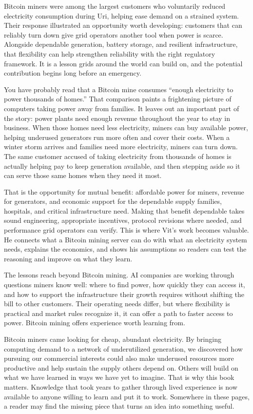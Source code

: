 Bitcoin miners were among the largest customers who voluntarily reduced electricity consumption during Uri, helping ease demand on a strained system. Their response illustrated an opportunity worth developing: customers that can reliably turn down give grid operators another tool when power is scarce. Alongside dependable generation, battery storage, and resilient infrastructure, that flexibility can help strengthen reliability with the right regulatory framework. It is a lesson grids around the world can build on, and the potential contribution begins long before an emergency.

You have probably read that a Bitcoin mine consumes ``enough electricity to power thousands of homes.'' That comparison paints a frightening picture of computers taking power away from families. It leaves out an important part of the story: power plants need enough revenue throughout the year to stay in business. When those homes need less electricity, miners can buy available power, helping underused generators run more often and cover their costs. When a winter storm arrives and families need more electricity, miners can turn down. The same customer accused of taking electricity from thousands of homes is actually helping pay to keep generation available, and then stepping aside so it can serve those same homes when they need it most.

That is the opportunity for mutual benefit: affordable power for miners, revenue for generators, and economic support for the dependable supply families, hospitals, and critical infrastructure need. Making that benefit dependable takes sound engineering, appropriate incentives, protocol revisions where needed, and performance grid operators can verify. This is where Vit's work becomes valuable. He connects what a Bitcoin mining server can do with what an electricity system needs, explains the economics, and shows his assumptions so readers can test the reasoning and improve on what they learn.

The lessons reach beyond Bitcoin mining. AI companies are working through questions miners know well: where to find power, how quickly they can access it, and how to support the infrastructure their growth requires without shifting the bill to other customers. Their operating needs differ, but where flexibility is practical and market rules recognize it, it can offer a path to faster access to power. Bitcoin mining offers experience worth learning from.

Bitcoin miners came looking for cheap, abundant electricity. By bringing computing demand to a network of underutilized generation, we discovered how pursuing our commercial interests could also make underused resources more productive and help sustain the supply others depend on. Others will build on what we have learned in ways we have yet to imagine. That is why this book matters. Knowledge that took years to gather through lived experience is now available to anyone willing to learn and put it to work. Somewhere in these pages, a reader may find the missing piece that turns an idea into something useful.

